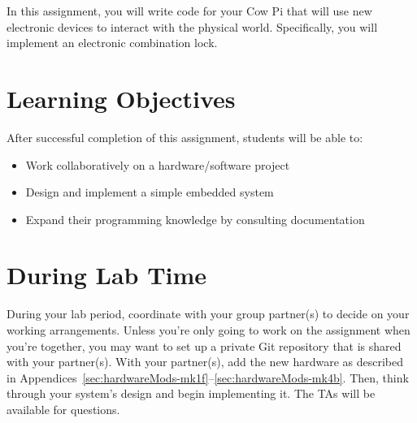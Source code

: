 In this assignment, you will write code for your Cow Pi that will use new electronic devices to interact with the physical world.
Specifically, you will implement an electronic combination lock.


\tableofcontents

\section*{Learning Objectives}

After successful completion of this assignment, students will be able to:
\begin{itemize}
    \item Work collaboratively on a hardware/software project
    \item Design and implement a simple embedded system
    \item Expand their programming knowledge by consulting documentation
\end{itemize}

\section*{During Lab Time}

During your lab period, coordinate with your group partner(s) to decide on your working arrangements.
Unless you're only going to work on the assignment when you're together, you may want to set up a private Git repository that is shared with your partner(s).
With your partner(s), add the new hardware as described in Appendices~\ref{sec:hardwareMods-mk1f}--\ref{sec:hardwareMods-mk4b}.
Then, think through your system's design and begin implementing it.
The TAs will be available for questions.
